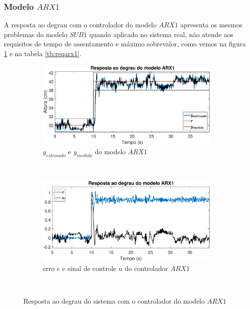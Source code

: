 \subsubsection{Modelo $ARX1$}

A resposta ao degrau com o controlador do modelo $ARX1$ apresenta os mesmos problemas do modelo $SUB1$ quando aplicado no sistema real, não atende aos requisitos de tempo de assentamento e máximo sobrevalor, como vemos na figura \ref{fig:steprarx1y} e na tabela \ref{tb:reqarx1}.
\begin{figure}[htb]
	\centering
	\begin{subfigure}[t]{0.48\textwidth}
		\includegraphics[width=1\linewidth]{steprarx1y}
		\caption[$y_{estimado}$ e $y_{medido}$ do modelo $ARX1$]{$y_{estimado}$ e $y_{medido}$ do modelo $ARX1$}
		\label{fig:steprarx1y}
	\end{subfigure}
	~ %
	\begin{subfigure}[t]{0.48\textwidth}
		\includegraphics[width=1\linewidth]{steprarx1e}
		\caption[erro $e$ e sinal de controle $u$ do controlador $ARX1$]{erro $e$ e sinal de controle $u$ do controlador $ARX1$}
		\label{fig:steprarx1e}
	\end{subfigure}
	~ %
	
	\caption{Resposta ao degrau do sistema com o controlador do modelo $ARX1$}\label{fig:steprarx1}
\end{figure}

